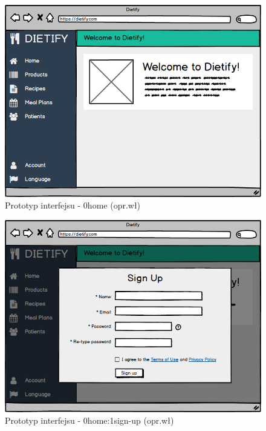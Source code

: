 \begin{minipage}{\textwidth}
    \begin{figure}[H]
        \centering\includegraphics[scale=0.55]{../mockup/0home.png}
        \caption{Prototyp interfejsu - 0home (opr.wł)}\label{rysunek:0home}
    \end{figure}
\end{minipage}
\begin{minipage}{\textwidth}
    \begin{figure}[H]
        \centering\includegraphics[scale=0.55]{../mockup/0home_1sign-up.png}
        \caption{Prototyp interfejsu - 0home:1sign-up (opr.wł)}\label{rysunek:0home_1sign-up}
    \end{figure}
\end{minipage}
